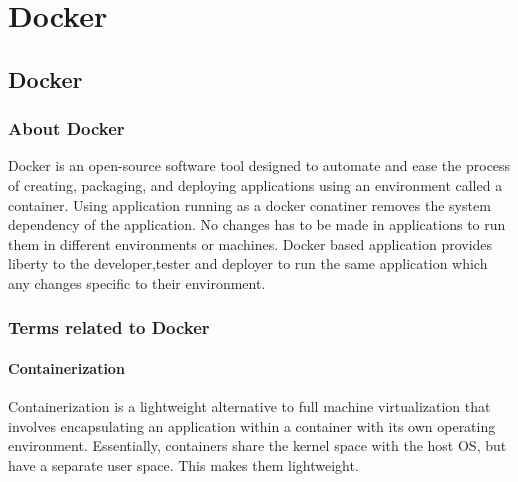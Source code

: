 \documentclass[12pt]{report}
\begin{document}
\chapter{Docker}
\section{Docker \cite{Docker}}
\subsection{About Docker}
Docker is an open-source software tool designed to automate and ease the process of creating, packaging, and deploying applications using an environment called a container. Using application running as a docker conatiner removes the system dependency of the application. No changes has to be made in applications to run them in different environments or machines. Docker based application provides liberty to the developer,tester and deployer to run the same application which any changes specific to their environment. 
\subsection{Terms related to Docker}
\subsubsection{Containerization}
Containerization is a lightweight alternative to full machine virtualization that involves encapsulating an application within a container with its own operating environment. Essentially, containers share the kernel space with the host OS, but have a separate user space. This makes them lightweight.
\end{document}
